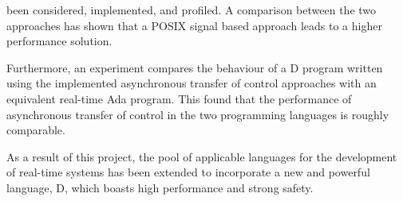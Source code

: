 been considered, implemented, and profiled. A comparison between the two approaches 
has shown that a POSIX signal based approach leads to a higher performance 
solution. 
\par\bigskip\noindent
Furthermore, an experiment compares the behaviour of a D program written 
using the implemented asynchronous transfer of control approaches with an equivalent 
real-time Ada program. This found that the performance of asynchronous transfer
of control in the two programming languages is roughly comparable. 
\par\bigskip\noindent
As a result of this project, the pool of applicable languages for the development 
of real-time systems has been extended to incorporate a new and powerful language, D, which 
boasts high performance and strong safety. 
